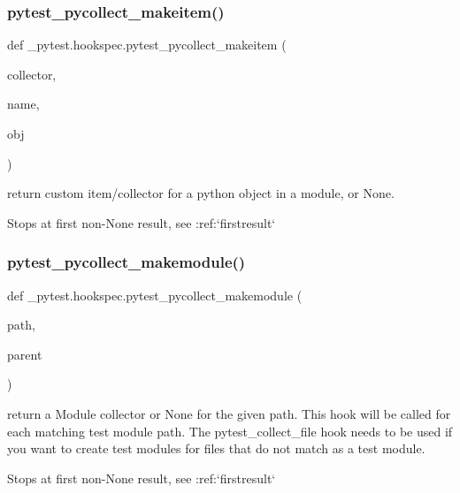\subsubsection{\texorpdfstring{pytest\+\_\+pycollect\+\_\+makeitem()}{pytest\_pycollect\_makeitem()}}
{\footnotesize\ttfamily def \+\_\+pytest.\+hookspec.\+pytest\+\_\+pycollect\+\_\+makeitem (\begin{DoxyParamCaption}\item[{}]{collector,  }\item[{}]{name,  }\item[{}]{obj }\end{DoxyParamCaption})}

\begin{DoxyVerb}return custom item/collector for a python object in a module, or None.

Stops at first non-None result, see :ref:`firstresult` \end{DoxyVerb}
 \mbox{\label{namespace__pytest_1_1hookspec_ae09fc8e9baa39a0989b848b74fdb85c1}} 
\subsubsection{\texorpdfstring{pytest\+\_\+pycollect\+\_\+makemodule()}{pytest\_pycollect\_makemodule()}}
{\footnotesize\ttfamily def \+\_\+pytest.\+hookspec.\+pytest\+\_\+pycollect\+\_\+makemodule (\begin{DoxyParamCaption}\item[{}]{path,  }\item[{}]{parent }\end{DoxyParamCaption})}

\begin{DoxyVerb}return a Module collector or None for the given path.
This hook will be called for each matching test module path.
The pytest_collect_file hook needs to be used if you want to
create test modules for files that do not match as a test module.

Stops at first non-None result, see :ref:`firstresult` \end{DoxyVerb}
 \mbox{\label{namespace__pytest_1_1hookspec_a660e06eb19db5285eaa93824265e5c53}} 
